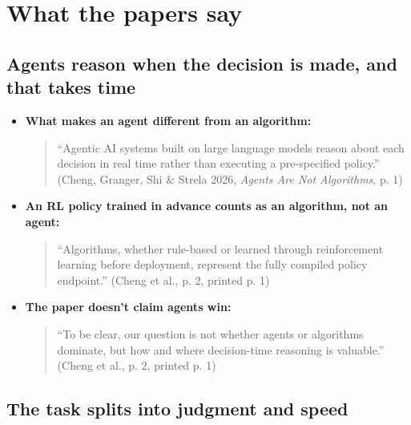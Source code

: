 \documentclass{article}
\begin{document}
\section{What the papers say}

\subsection{Agents reason when the decision is made, and that takes time}

\begin{itemize}

\item \textbf{What makes an agent different from an algorithm:}

\begin{quote}``Agentic AI systems built on large language models reason about each decision in real time rather than executing a pre-specified policy.'' (Cheng, Granger, Shi \& Strela 2026, \emph{Agents Are Not Algorithms}, p. 1)\end{quote}

\item \textbf{An RL policy trained in advance counts as an algorithm, not an agent:}

\begin{quote}``Algorithms, whether rule-based or learned through reinforcement learning before deployment, represent the fully compiled policy endpoint.'' (Cheng et al., p. 2, printed p. 1)\end{quote}

\item \textbf{The paper doesn't claim agents win:}

\begin{quote}``To be clear, our question is not whether agents or algorithms dominate, but how and where decision-time reasoning is valuable.'' (Cheng et al., p. 2, printed p. 1)\end{quote}

\end{itemize}

\subsection{The task splits into judgment and speed}
\end{document}
